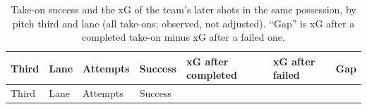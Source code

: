 \documentclass[
  12pt]{article}
\begin{document}
\begin{longtable}[]{@{}
  >{\raggedright\arraybackslash}p{}
  >{\raggedright\arraybackslash}p{}
  >{\raggedleft\arraybackslash}p{}
  >{\raggedleft\arraybackslash}p{}
  >{\raggedleft\arraybackslash}p{}
  >{\raggedleft\arraybackslash}p{}
  >{\raggedleft\arraybackslash}p{}@{}}
\caption{Take-on success and the xG of the team's later shots in the
same possession, by pitch third and lane (all take-ons; observed, not
adjusted). ``Gap'' is xG after a completed take-on minus xG after a
failed one.}\label{tbl-value}\tabularnewline
\toprule\noalign{}
\begin{minipage}[b]{\linewidth}\raggedright
Third
\end{minipage} & \begin{minipage}[b]{\linewidth}\raggedright
Lane
\end{minipage} & \begin{minipage}[b]{\linewidth}\raggedleft
Attempts
\end{minipage} & \begin{minipage}[b]{\linewidth}\raggedleft
Success
\end{minipage} & \begin{minipage}[b]{\linewidth}\raggedleft
xG after completed
\end{minipage} & \begin{minipage}[b]{\linewidth}\raggedleft
xG after failed
\end{minipage} & \begin{minipage}[b]{\linewidth}\raggedleft
Gap
\end{minipage} \\
\midrule\noalign{}
\endfirsthead
\toprule\noalign{}
\begin{minipage}[b]{\linewidth}\raggedright
Third
\end{minipage} & \begin{minipage}[b]{\linewidth}\raggedright
Lane
\end{minipage} & \begin{minipage}[b]{\linewidth}\raggedleft
Attempts
\end{minipage} & \begin{minipage}[b]{\linewidth}\raggedleft
Success
\end{minipage} & \begin{minipage}[b]{\linewidth}\raggedleft

\end{minipage}
\end{longtable}
\end{document}

